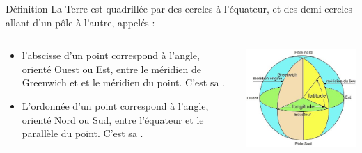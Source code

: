 \documentclass[xcolor={dvipsnames}]{beamer}
\begin{document}
\begin{frame}
	\begin{alertblock}{Définition}
		La Terre est quadrillée par des cercles  à l'équateur, et des demi-cercles allant d'un pôle à l'autre, appelés  :
		\begin{columns}
			\begin{column}{7cm}
				\begin{itemize}
					\item l'abscisse d'un point correspond à l'angle, orienté Ouest ou Est, entre le méridien de Greenwich et et le méridien du point. C'est sa . 
					\item L'ordonnée d'un point correspond à l'angle, orienté Nord ou Sud, entre l'équateur et le parallèle du point. C'est sa .
				\end{itemize}
			\end{column}
			
			\begin{column}{5cm}
				\begin{center}
					\includegraphics[scale=0.45]{../img/terre}
				\end{center}
			\end{column}
		\end{columns}
		
		
		
	\end{alertblock}
\end{frame}
\end{document}
